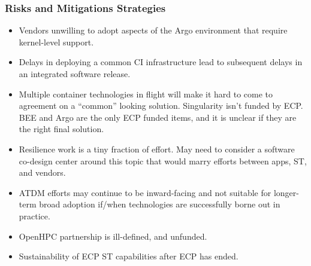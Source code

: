 \subsubsection{Risks and Mitigations Strategies}
\begin{itemize}
	\item Vendors unwilling to adopt aspects of the Argo environment that require kernel-level support.
	\item Delays in deploying a common CI infrastructure lead to subsequent delays in an integrated software release.
	\item Multiple container technologies in flight will make it hard to come to agreement on a “common” looking solution. Singularity isn't funded by ECP. BEE and Argo are the only ECP funded items, and it is unclear if they are the right final solution.
	\item Resilience work is a tiny fraction of effort. May need to consider a software co-design center around this topic that would marry efforts between apps, ST, and vendors.
	\item ATDM efforts may continue to be inward-facing and not suitable for longer-term broad adoption if/when technologies are successfully borne out in practice.
	\item OpenHPC partnership is ill-defined, and unfunded.
	\item Sustainability of ECP ST capabilities after ECP has ended.
\end{itemize}
